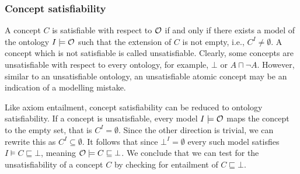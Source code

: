 \subsubsection{Concept satisfiability} \label{concept-satisfiability}

A concept $C$ is satisfiable with respect to $\mathcal{O}$ if and only if there exists a model of the ontology $I \models \mathcal{O}$ such that the extension of $C$ is not empty, i.e., $C^I \not= \emptyset$. A concept which is not satisfiable is called unsatisfiable. Clearly, some concepts are unsatisfiable with respect to every ontology, for example, $\bot$ or $A \sqcap \lnot A$. However, similar to an unsatisfiable ontology, an unsatisfiable atomic concept may be an indication of a modelling mistake.

Like axiom entailment, concept satisfiability can be reduced to ontology satisfiability. If a concept is unsatisfiable, every model $I \models \mathcal{O}$ maps the concept to the empty set, that is $C^I = \emptyset$. Since the other direction is trivial, we can rewrite this as $C^I \subseteq \emptyset$. It follows that since $\bot^I = \emptyset$ every such model satisfies $I \models C \sqsubseteq \bot$, meaning $\mathcal{O} \models C \sqsubseteq \bot$. We conclude that we can test for the unsatisfiability of a concept $C$ by checking for entailment of $C \sqsubseteq \bot$.
